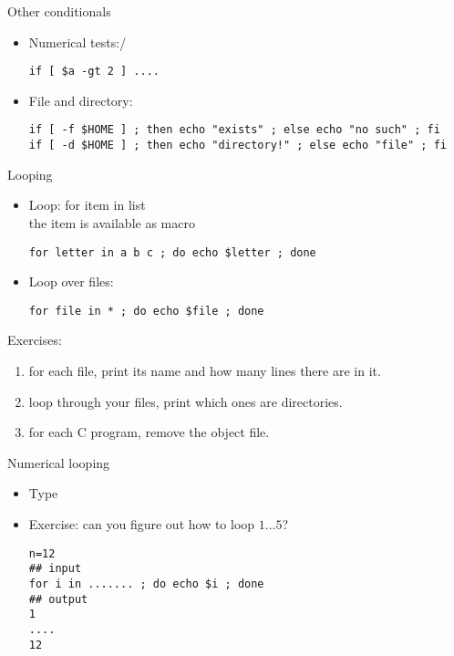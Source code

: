 \documentclass[11pt,headernav]{beamer}
\begin{document}
\begin{numberedframe}{Other conditionals}
  \begin{itemize}
\item Numerical tests:/
\begin{verbatim}
if [ $a -gt 2 ] ....
\end{verbatim}
\item File and directory:
{ \footnotesize
\begin{verbatim}
if [ -f $HOME ] ; then echo "exists" ; else echo "no such" ; fi
if [ -d $HOME ] ; then echo "directory!" ; else echo "file" ; fi
\end{verbatim}
}
  \end{itemize}
\end{numberedframe}

\begin{numberedframe}{Looping}
  \label{sl-lnx:for}
  \begin{itemize}
  \item Loop: for item in list\\
    the item is available as macro
\begin{verbatim}
for letter in a b c ; do echo $letter ; done
\end{verbatim}
\item Loop over files:
\begin{verbatim}
for file in * ; do echo $file ; done
\end{verbatim}
  \end{itemize}
  Exercises:
  \begin{enumerate}
  \item for each file, print its name and how many lines there are in it.
  \item loop through your files, print which ones are directories.
  \item for each C program, remove the object file.
  \end{enumerate}
\end{numberedframe}

\begin{numberedframe}{Numerical looping}

  \begin{itemize}
  \item Type 
  \item Exercise: can you figure out how to loop $1\ldots5$?
\begin{verbatim}
n=12
## input
for i in ....... ; do echo $i ; done
## output
1
....
12
\end{verbatim}
  \end{itemize}
\end{numberedframe}
\end{document}
